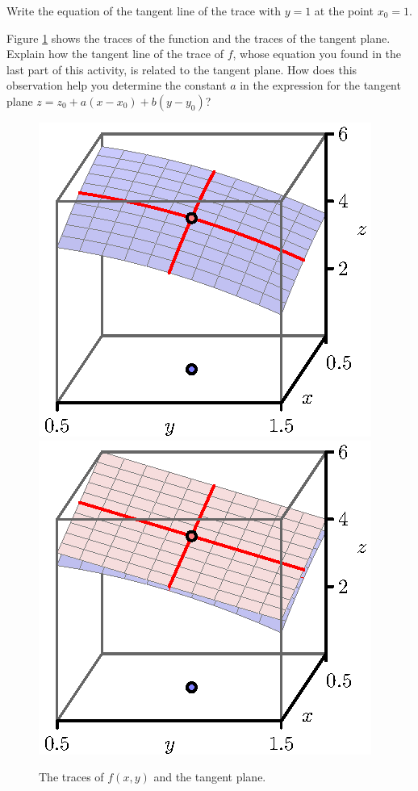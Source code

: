 \begin{activity}
\item Write the equation of the tangent line of the trace with $y=1$
  at the point $x_0=1$.  

\item Figure \ref{F:10.4.tangent.traces} shows the traces of the
  function and the traces of the tangent plane.  Explain how the
  tangent line of the trace of $f$, whose equation you found in the
  last part of this 
  activity, is related to the tangent plane.  How does this
  observation help you determine the constant $a$ in the expression
  for the tangent plane $z
  = z_0+a(x-x_0) + b(y-y_0)$?  

  \begin{figure}[ht]
    \begin{center}
      \includegraphics{figures/fig_10_4_tangent_5.eps}
      \hspace*{20pt}
      \includegraphics{figures/fig_10_4_tangent_6.eps}
    \end{center}
    \caption{The traces of $f(x,y)$ and the tangent plane.}
    \label{F:10.4.tangent.traces}
  \end{figure}


\end{activity}
